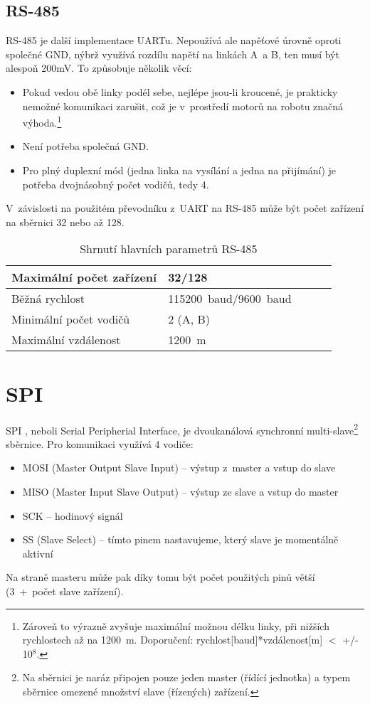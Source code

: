 \subsection{RS-485}\label{RS-485} %
RS-485 \cite{RS-485} je další implementace UARTu.
Nepoužívá ale napěťové úrovně oproti společné GND, nýbrž využívá rozdílu napětí na linkách A~a B, ten musí být alespoň 200mV.
To způsobuje několik věcí:
\begin{itemize}
	\item Pokud vedou obě linky podél sebe, nejlépe jsou-li kroucené, je prakticky nemožné komunikaci zarušit, což je v~prostředí motorů na robotu značná výhoda.\footnote{Zároveň to výrazně zvyšuje maximální možnou délku linky, při nižších rychlostech až na 1200~m. Doporučení: rychlost[baud]*vzdálenost[m] $<$ +/- 10$^{8}$.}   
	\item Není potřeba společná GND.
	\item Pro plný duplexní mód (jedna linka na vysílání a jedna na přijímání) je potřeba dvojnásobný počet vodičů, tedy 4.
\end{itemize}
V~závislosti na použitém převodníku z~UART na RS-485 může být počet zařízení na sběrnici 32 nebo až 128.
\begin{table}[h]
	
	\centering
	\begin{tabular}{|l|l|l|l|l|} \hline
		Maximální počet zařízení      & 32/128              \\ \hline
		Běžná rychlost                & 115200~baud/9600~baud        \\ \hline
		Minimální počet vodičů        & 2 (A, B) \\ \hline
		Maximální vzdálenost		  & 1200~m \\ \hline
	\end{tabular}
	\caption{Shrnutí hlavních parametrů RS-485}
\end{table}

\section{SPI}
SPI \cite{nxp:AN2847}, neboli Serial Peripherial Interface, je dvoukanálová synchronní multi-slave\footnote{Na sběrnici je naráz připojen pouze jeden master (řídící jednotka) a typem sběrnice omezené množství slave (řízených) zařízení.} sběrnice.
Pro komunikaci využívá 4 vodiče:
\begin{itemize}
		\item MOSI (Master Output Slave Input) -- výstup z~master a vstup do slave
		\item MISO (Master Input Slave Output) -- výstup ze slave a vstup do master
		\item SCK -- hodinový signál
		\item SS (Slave Select) -- tímto pinem nastavujeme, který slave je momentálně aktivní
\end{itemize}
Na straně masteru může pak díky tomu být počet použitých pinů větší (3~+~počet slave zařízení).

